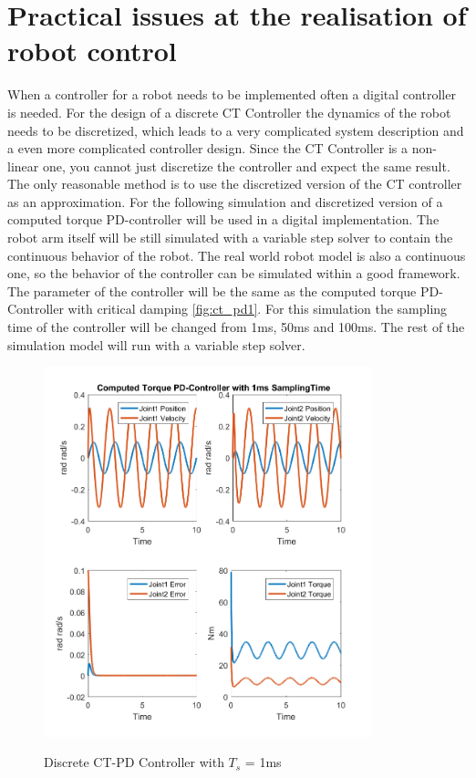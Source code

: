 \chapter{ Practical issues at the realisation of robot control}

 When a controller for a robot needs to be implemented often a digital controller is needed. For the design of a discrete CT Controller the dynamics of the robot needs to be discretized, which leads to a very complicated system description and a even more complicated controller design. Since the CT Controller is a non-linear one, you cannot just discretize the controller and expect the same result. The only reasonable method is to use the discretized version of the CT controller as an approximation. For the following simulation and discretized version of a computed torque PD-controller will be used in a digital implementation. The robot arm itself will be still simulated with a variable step solver to contain the continuous behavior of the robot. The real world robot model is also a continuous one, so the behavior of the controller can be simulated within a good framework.\\
 The parameter of the controller will be the same as the computed torque PD-Controller with critical damping \ref{fig:ct_pd1}. For this simulation the sampling time of the controller will be changed from  1ms, 50ms and 100ms. The rest of the simulation model will run with a variable step solver.
 
 \begin{figure}[h]
 	\centering
 	\includegraphics[width=0.85\textwidth]{pics/ComputedTorquePD-Controllerwith1msSamplingTime.png}\\
 	\caption{Discrete CT-PD Controller with $T_s$ = 1ms}
 	\label{fig:ch3_digi1}
 \end{figure}

